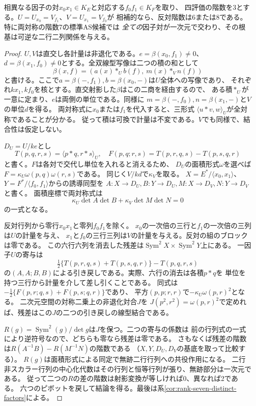 \begin{theorem}[横断する二因子での階数の飛び]\label{thm:transverse-product-even-rank}
相異なる因子の対$x_0 x_1\in K_E$と対応する$f_0 f_1\in K_F$を取り、
四評価の階数を3とする。$U=U_{x_0}=V_{f_1}$、$V=U_{x_1}=V_{f_0}$が
相補的なら、反対階数は6または8である。特に両対称の階数7の標準AS候補では
\emph{全ての}因子対が一次元で交わり、その根基は可逆な二行二列関係を与える。
\end{theorem}
\begin{proof}
$U,V$は直交し各計量は非退化である。$e=\beta(x_0,f_1)\ne0$、
$d=\beta(x_1,f_0)\ne0$とする。全双線型写像は二つの積の和として
\[
 \beta(x,f)=(a(x)*_U b(f),\ m(x)*_V n(f))
\]
と書ける。ここで$a=\beta(-,f_1), b=\beta(x_0,-)$は$U$全体への写像であり、
それぞれ$kx_1,kf_0$を核とする。直交射影した$\beta$はこの二商を経由するので、
ある積$*_U$が一意に定まり、$e$は両側の単位である。同様に
$m=\beta(-,f_0),n=\beta(x_1,-)$と$V$の単位$d$を得る。
両対称式に$x_0$または$f_1$を代入すると、三形式
$\langle u*v,w\rangle_U$が全対称であることが分かる。
従って積は可換で計量は不変である。$V$でも同様で、結合性は仮定しない。

$D_U=U/ke$とし
\[
 T(p,q,r,s)=\langle p*q,r*s\rangle_U,\quad
 F(p,q;r,s)=T(p,r,q,s)-T(p,s,q,r)
\]
と書く。$F$は各対で交代し単位を入れると消えるため、
$D_U$の面積形式$\omega$を選べば$F=\kappa_U\omega(p,q)\omega(r,s)$である。
同じく$V/kd$で$\kappa_V$を取る。
$X=E^*/\langle x_0,x_1\rangle$、$Y=F^*/\langle f_0,f_1\rangle$からの誘導同型を
$A:X\to D_U,B:Y\to D_U,M:X\to D_V,N:Y\to D_V$と書く。
面積座標で両対称式は
\[
 \kappa_U\det A\det B+\kappa_V\det M\det N=0
\]
の一式となる。

反対行列から零行$x_0x_1$と零列$f_0f_1$を除く。
$x_0$の一次倍の三行と$f_1$の一次倍の三列は$U$の計量を与え、
$x_1$と$f_0$の三行三列は$V$の計量を与える。反対の組のブロックは零である。
この六行六列を消去した残差は$\operatorname{Sym}^2 X\times\operatorname{Sym}^2 Y$上にある。
一因子$U$の寄与は
\[
 \tfrac12\{T(p,r,q,s)+T(p,s,q,r)\}-T(p,q,r,s)
\]
の$(A,A;B,B)$による引き戻しである。実際、六行の消去は各積$p*q$を
単位を持つ三行から計量を介して差し引くことである。
同式は$-\tfrac12\{F(p,r;q,s)+F(p,s;q,r)\}$であり、
平方$(p,p;r,r)$で$-\kappa_U\omega(p,r)^2$となる。
二次元空間の対称二乗上の非退化対合$J$を
$J(p^2,r^2)=\omega(p,r)^2$で定めれば、残差はこの$J$の二つの引き戻しの線型結合である。

$R(g)=\operatorname{Sym}^2(g)/\det g$は$J$を保つ。二つの寄与の係数は
前の行列式の一式により逆符号なので、どちらも零なら残差は零である。
さもなくば残差の階数は$R(A^{-1}B)-R(M^{-1}N)$の階数である
（$X,Y,D_U,D_V$の基底を取って比較する）。
$R(g)$は面積形式による同定で無跡二行行列への共役作用になる。
二行非スカラー行列の中心化代数はその行列と恒等行列が張り、無跡部分は一次元である。
従って二つの$R$の差の階数は射影変換が等しければ0、異なれば2である。
六つのピボットを戻して結論を得る。最後は系\ref{cor:rank-seven-distinct-factors}による。
\end{proof}

